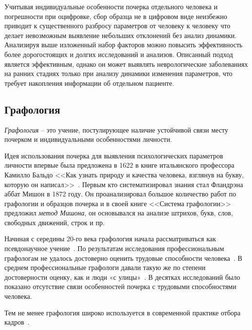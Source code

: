 Учитывая индивидуальные особенности почерка отдельного человека и погрешности при оцифровке, сбор образца не в цифровом виде неизбежно приводит к существенного разбросу параметров от человеку к человеку что делает невозможным выявление небольших отклонений без анализ динамики.
Анализируя выше изложенный набор факторов можно повысить эффективность более дорогостоящих и долгих исследований и анализов.
Описанный подход является эффективным, однако он может выявлять неврологические заболеваниях на ранних стадиях только при анализу динамики изменения параметров, что требует накопления информации об отдельном пациенте.

\subsection{Графология}
\label{sub:domain:grafologic}
\emph{Графология} -- это учение, постулирующее наличие устойчивой связи месту почерком и индивидуальными особенностями личности.

Идея использования почерка для выявления психологических параметров личности впервые была предложена в 1622 в книге итальянского профессора Камилло Бальдо <<Как узнать природу и качества человека, взглянув на букву, которую он написал>>~\cite{kamillo_grafology}. Первым кто систематизировал знания стал Фландрэна аббат Мишон в 1872 году. Он проанализировал большое количество работ по графологии и образцов почерка и в своей книге <<Система графологии>> предложил \emph{метод Мишона}, он основывался на анализе штрихов, букв, слов, свободных движений, строк и пр.~\cite{mishon_grafology}

Начиная с середины 20-го века графология начала рассматриваться как псевдонаучное учение~\cite{wiki_graphology}. По результатам исследования профессиональным графологам не удалось достоверно оценить трудовые способности человека~\cite{what_your_handwriting}. В среднем профессиональные графологи давали такую же по степени достоверности оценку, как и люди «с улицы»~\cite{neter_shakhar_psevdograph, king_koehler_psevdograph}. В десятках исследований было показано отсутствие связи особенностей почерка с трудовыми способностями человека.

Тем не менее графология широко используется в современной практике отбора кадров~\cite{graphology_psyfactor}.

